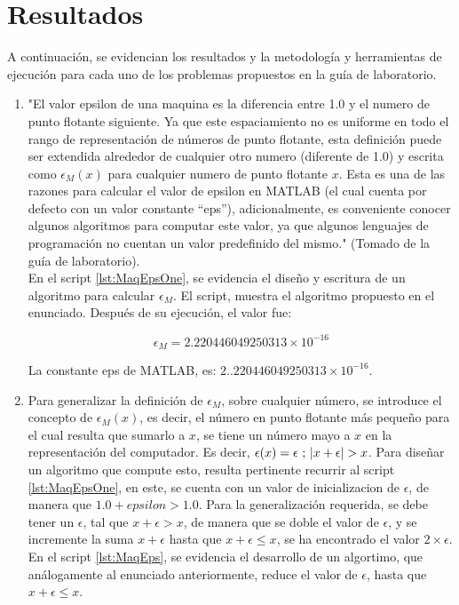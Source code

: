 \documentclass[11pt, spanish]{article}
\begin{document}
\section{Resultados}

A continuación, se evidencian los resultados y la metodología y herramientas de ejecución para cada uno de los problemas propuestos en la guía de laboratorio.

\begin{enumerate}

\item "El valor epsilon de una maquina es la diferencia entre 1.0 y el numero de punto flotante siguiente. Ya que este espaciamiento no es uniforme en todo el rango de representación de números de punto flotante, esta definición puede ser extendida alrededor de cualquier otro numero (diferente de 1.0) y escrita como $\epsilon_M(x)$ para cualquier numero de punto flotante $x$. Esta es una de las razones para calcular el valor de epsilon en \textsc{MATLAB} (el cual cuenta por defecto con un valor constante “eps”), adicionalmente, es conveniente conocer algunos algoritmos para computar este valor, ya que algunos lenguajes de programación no cuentan un valor predefinido del mismo." (Tomado de la guía de laboratorio).\\

En el script \ref{lst:MaqEpsOne}, se evidencia el diseño y escritura de un algoritmo para calcular $\epsilon_M$. El script, muestra el algoritmo propuesto en el enunciado. Después de su ejecución, el valor fue:

$$\epsilon_M = 2.220446049250313 \times 10 ^{-16}$$

La constante eps de \textsc{MATLAB}, es: $2..220446049250313 \times 10^{-16}$.

\item Para generalizar la definición de $\epsilon_M$, sobre cualquier número, se introduce el concepto de $\epsilon_M(x)$, es decir, el número en punto flotante más pequeño para el cual resulta que sumarlo a $x$, se tiene un número mayo a $x$ en la representación del computador. Es decir, $\epsilon(x) = \epsilon \ ;\ \abs{x + \epsilon} > x$. Para diseñar un algoritmo que compute esto, resulta pertinente recurrir al script \ref{lst:MaqEpsOne}, en este, se cuenta con un valor de inicializacion de $\epsilon$, de manera que $1.0 + epsilon > 1.0$. Para la generalización requerida, se debe tener un $\epsilon$, tal que $x + \epsilon > x$, de manera que se doble el valor de $\epsilon$, y se incremente la suma $x + \epsilon$ hasta que $x + \epsilon \leq x$, se ha encontrado el valor $2 \times \epsilon$. En el script \ref{lst:MaqEps}, se evidencia el desarrollo de un algortimo, que análogamente al enunciado anteriormente, reduce el valor de $\epsilon$, hasta que $x + \epsilon \leq x$.


\end{enumerate}
\end{document}
